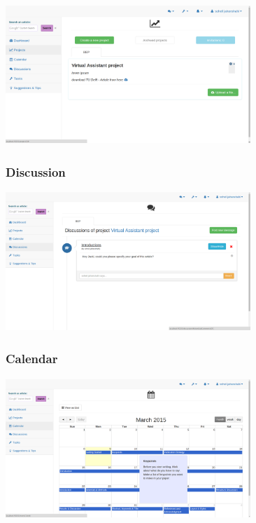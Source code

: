 \begin{center}
\includegraphics[height=200px, width=350px]{./img/dsgn_img/project.png}
	
\end{center}
\subsubsection{Discussion}

\begin{center}
\includegraphics[height=200px, width=350px]{./img/dsgn_img/discussion.png}
	
\end{center}

\subsubsection{Calendar}

\begin{center}
\includegraphics[height=200px, width=350px]{./img/dsgn_img/calendar.png}
	
\end{center}

